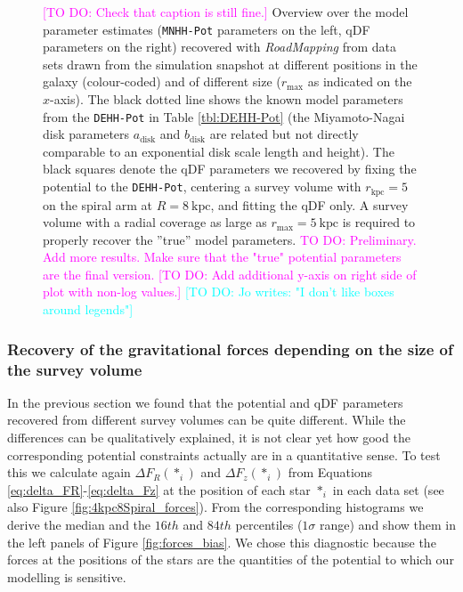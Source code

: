 \documentclass[iop,revtex4,numberedappendix,appendixfloats]{emulateapj}
\newcommand{\RM}{{\sl RoadMapping}}
\newcommand{\Wilma}[1]{\textcolor{Magenta}{#1}}
\newcommand{\Jo}[1]{\textcolor{Cyan}{#1}}
\begin{document}
\begin{figure}[!htbp]
\caption{\Wilma{[TO DO: Check that caption is still fine.]} Overview over the model parameter estimates (\texttt{MNHH-Pot} parameters on the left, qDF parameters on the right) recovered with \RM{} from data sets drawn from the simulation snapshot at different positions in the galaxy (colour-coded) and of different size ($r_\text{max}$ as indicated on the $x$-axis). The black dotted line shows the known model parameters from the \texttt{DEHH-Pot} in Table \ref{tbl:DEHH-Pot} (the Miyamoto-Nagai disk parameters $a_\text{disk}$ and $b_\text{disk}$ are related but not directly comparable to an exponential disk scale length and height). The black squares denote the qDF parameters we recovered by fixing the potential to the \texttt{DEHH-Pot}, centering a survey volume with $r_\text{kpc}=5$ on the spiral arm at $R=8~\text{kpc}$, and fitting the qDF only. A survey volume with a radial coverage as large as $r_\text{max}=5~\text{kpc}$ is required to properly recover the ''true'' model parameters. \Wilma{TO DO: Preliminary. Add more results. Make sure that the "true" potential parameters are the final version.} \Wilma{[TO DO: Add additional y-axis on right side of plot with non-log values.]} \Jo{[TO DO: Jo writes: "I don't like boxes around legends"]}}
\label{fig:model_parameters}
\end{figure}

\subsubsection{Recovery of the gravitational forces depending on the size of the survey volume}\label{sec:forces_bias}

In the previous section we found that the potential and qDF parameters recovered from different survey volumes can be quite different. While the differences can be qualitatively explained, it is not clear yet how good the corresponding potential constraints actually are in a quantitative sense. To test this we calculate again $\Delta F_R(*_i)$ and $\Delta F_z(*_i)$ from Equations \eqref{eq:delta_FR}-\eqref{eq:delta_Fz} at the position of each star $*_i$ in each data set (see also Figure \ref{fig:4kpc8Spiral_forces}). From the corresponding histograms we derive the median and the $16th$ and $84th$ percentiles ($1\sigma$ range) and show them in the left panels of Figure \ref{fig:forces_bias}. We chose this diagnostic because the forces at the positions of the stars are the quantities of the potential to which our modelling is sensitive.
\end{document}

